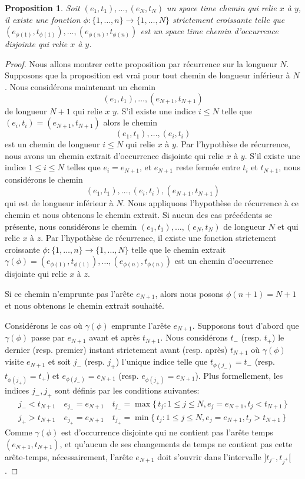 \documentclass[titlepage,a4paper,12pt]{article}
\newcounter{prop}
\newtheorem{ocdis}[prop]{Proposition}
\begin{document}
\begin{ocdis}
Soit $(e_1,t_1),\dots,(e_N,t_N)$ un space time chemin qui relie $x$ à $y$, il existe une fonction $\phi: \{1,\dots, n\}\rightarrow \{1,\dots, N\}$ strictement croissante telle que $(e_{\phi(1)},t_{\phi(1)}),\dots,(e_{\phi(n)},t_{\phi(n)})$ est un space time chemin d'occurrence disjointe qui relie $x$ à $y$.
\end{ocdis}
\begin{proof}
Nous allons montrer cette proposition par récurrence sur la longueur $N$. Supposons que la proposition est vrai pour tout chemin de longueur inférieur à $N$. Nous considérons maintenant un chemin $$(e_1,t_1),\dots, (e_{N+1},t_{N+1})$$ de longueur $N+1$ qui relie $x$ $y$. S'il existe une indice $i\leqslant N$ telle que $(e_i,t_i) = (e_{N+1},t_{N+1})$ alors le chemin $$(e_1,t_1),\dots,(e_i,t_i)
$$ est un chemin de longueur $i\leqslant N$ qui relie $x$ à $y$. Par l'hypothèse de récurrence, nous avons un chemin extrait d'occurrence disjointe qui relie $x$ à $y$. 
S'il existe une indice $1\leqslant i\leqslant N$ telles que $e_i = e_{N+1}$, et $e_{N+1}$ reste fermée entre $t_i$ et $t_{N+1}$, nous considérons le chemin $$(e_1,t_1), \dots, (e_{i},t_{i}), (e_{N+1},t_{N+1})$$ qui est de longueur inférieur à $N$. Nous appliquons l'hypothèse de récurrence à ce chemin et nous obtenons le chemin extrait. Si aucun des cas précédents se présente, nous considérons le chemin $(e_1,t_1),\dots,(e_N,t_N)$ de longueur $N$ et qui relie $x$ à $z$. Par l'hypothèse de récurrence, il existe une fonction strictement croissante $\phi:\{1,\dots,n\}\rightarrow \{1,\dots, N\}$ telle que le chemin extrait $\gamma(\phi) = (e_{\phi(1)},t_{\phi(1)}),\dots,(e_{\phi(n)},t_{\phi(n)})$ est un chemin d'occurrence disjointe qui relie $x$ à $z$. 

Si ce chemin n'emprunte pas l'arête $e_{N+1}$, alors nous posons $\phi(n+1) = N+1$ et nous obtenons le chemin extrait souhaité.

Considérons le cas où $\gamma(\phi)$ emprunte l'arête $e_{N+1}$. Supposons tout d'abord que $\gamma(\phi)$ passe par $e_{N+1}$ avant et après $t_{N+1}$. Nous considérons $t_-$ (resp. $t_+$) le dernier (resp. premier) instant strictement avant (resp. après) $t_{N+1}$ où $\gamma(\phi)$ visite $e_{N+1}$ et soit $j_-$ (resp. $j_+$) l'unique indice telle que $t_{\phi(j_-)}= t_-$ (resp. $t_{\phi(j_+)}= t_+$) et $e_{\phi(j_-)}= e_{N+1}$ (resp. $e_{\phi(j_+)}= e_{N+1}$). Plus formellement, les indices $j_-,j_+$ sont définis par les conditions suivantes:
\begin{align*}
{j_-}< t_{N+1}\quad e_{j_-} = e_{N+1}\quad t_{j_-} = \max \big\{\,t_j:1\leqslant j \leqslant N, e_j = e_{N+1}, t_j < t_{N+1}\,\big\}\\
{j_+}> t_{N+1}\quad e_{j_+} = e_{N+1}\quad t_{j_+} = \min \big\{\,t_j:1\leqslant j \leqslant N, e_j = e_{N+1}, t_j > t_{N+1}\,\big\}
\end{align*}
Comme $\gamma(\phi)$ est d'occurrence disjointe qui ne contient pas l'arête temps $(e_{N+1},t_{N+1})$, et qu'aucun de ses changements de temps ne contient pas cette arête-temps, nécessairement, l'arête $e_{N+1}$ doit s'ouvrir dans l'intervalle $]t_{j^-},t_{j^+}[$.


\end{proof}
\end{document}
